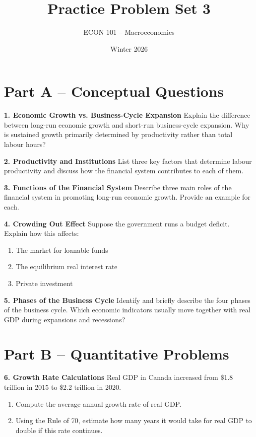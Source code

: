 \documentclass[12pt]{article}
\title{Practice Problem Set 3}
\author{ECON 101 -- Macroeconomics}
\date{Winter 2026}
\begin{document}
\maketitle

\section*{Part A – Conceptual Questions}

\textbf{1. Economic Growth vs. Business-Cycle Expansion}  
Explain the difference between long-run economic growth and short-run business-cycle expansion.  
Why is sustained growth primarily determined by productivity rather than total labour hours?



\textbf{2. Productivity and Institutions}  
List three key factors that determine labour productivity and discuss how the financial system contributes to each of them.



\textbf{3. Functions of the Financial System}  
Describe three main roles of the financial system in promoting long-run economic growth.  
Provide an example for each.



\textbf{4. Crowding Out Effect}  
Suppose the government runs a budget deficit. Explain how this affects:
\begin{enumerate}
    \item The market for loanable funds
    \item The equilibrium real interest rate
    \item Private investment
\end{enumerate}



\textbf{5. Phases of the Business Cycle}  
Identify and briefly describe the four phases of the business cycle.  
Which economic indicators usually move together with real GDP during expansions and recessions?

\newpage

\section*{Part B – Quantitative Problems}

\textbf{6. Growth Rate Calculations}  
Real GDP in Canada increased from \$1.8 trillion in 2015 to \$2.2 trillion in 2020.
\begin{enumerate}
    \item Compute the average annual growth rate of real GDP.
    \item Using the Rule of 70, estimate how many years it would take for real GDP to double if this rate continues.
\end{enumerate}
\end{document}
